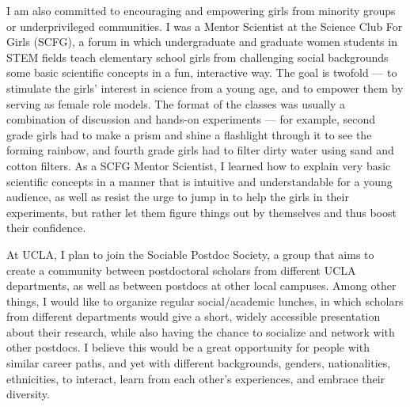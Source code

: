 \documentclass[12pt, letterpaper]{article}
\begin{document}
I am also committed to encouraging and empowering girls from minority groups or underprivileged communities. I was a Mentor Scientist at the Science Club For Girls (SCFG), a forum in which undergraduate and graduate women students in STEM fields teach elementary school girls from challenging social backgrounds some basic scientific concepts in a fun, interactive way. The goal is twofold --- to stimulate the girls' interest in science from a young age, and to empower them by serving as female role models. The format of the classes was usually a combination of discussion and hands-on experiments --- for example, second grade girls had to
make a prism and shine a flashlight through it to see the forming rainbow, and fourth grade girls had to filter dirty water using sand and cotton filters. As a SCFG Mentor Scientist, I learned how to explain very basic scientific concepts in a manner that is intuitive and understandable for a young audience, as well as resist the urge to jump in to help the girls in their experiments, but rather 
let them figure things out by themselves and thus boost their confidence. 

At UCLA, I plan to join the Sociable Postdoc Society, a group that aims to create a community between postdoctoral scholars from different UCLA departments, as well as between postdocs at other local campuses. Among other things, I would like to organize regular social/academic lunches, in which scholars from different departments would give a short, widely accessible presentation about their research, while also having the chance to socialize and network with other postdocs. I believe this would be a great opportunity for people with similar career paths, and yet with different backgrounds, genders, nationalities, ethnicities, to interact, learn from each other's experiences, and embrace their diversity.




%
%


\end{document}
